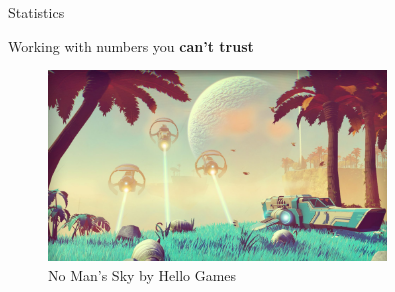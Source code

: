 \documentclass[aspectratio=169,xcolor=svgnames]{beamer}
\begin{document}
\begin{frame}
  \huge
  \center
  Statistics

  Working with numbers you \textbf{can't trust}
\end{frame}

\begin{frame}
  \begin{figure}[ht]
    \centering
    \includegraphics[width=0.8\textwidth]{figures/no-mans-sky-screenshot.jpg}
    \caption{No Man's Sky by Hello Games}
  \end{figure}
\end{frame}
\end{document}
